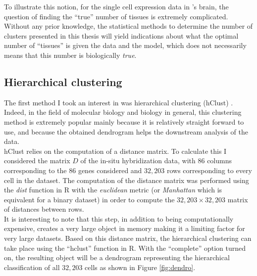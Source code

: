 	To illustrate this notion, for the single cell expression data in \platy{}'s brain, the question of finding the ``true'' number of tissues is extremely complicated. Without any prior knowledge, the statistical methods to determine the number of clusters presented in this thesis will yield indications about what the optimal number of ``tissues'' is given the data and the model, which does not necessarily means that this number is biologically \emph{true}.\\
	
	
		\subsection{Hierarchical clustering}
	The first method I took an interest in was hierarchical clustering (hClust) \citep{johnson67}. Indeed, in the field of molecular biology and biology in general, this clustering method is extremely popular mainly because it is relatively straight forward to use, and because the obtained dendrogram helps the downstream analysis of the data.\\
	
	hClust relies on the computation of a distance matrix. To calculate this I considered the matrix $D$ of the in-situ hybridization data, with $86$ columns corresponding to the 86 genes considered and $32,203$ rows corresponding to every cell in the dataset. The computation of the distance matrix was performed using the \emph{dist} function in R with the \emph{euclidean} metric (or \emph{Manhattan} which is equivalent for a binary dataset) in order to compute the $32,203 \times 32,203$ matrix of distances between rows.\\
	
	It is interesting to note that this step, in addition to being computationally expensive, creates a very large object in memory making it a limiting factor for very large datasets. Based on this distance matrix, the hierarchical clustering can take place using the ``hclust'' function in R. With the ``complete'' option turned on, the resulting object will be a dendrogram  representing the hierarchical classification of all $32,203$ cells as shown in Figure \ref{fig:dendro}.\\
	
